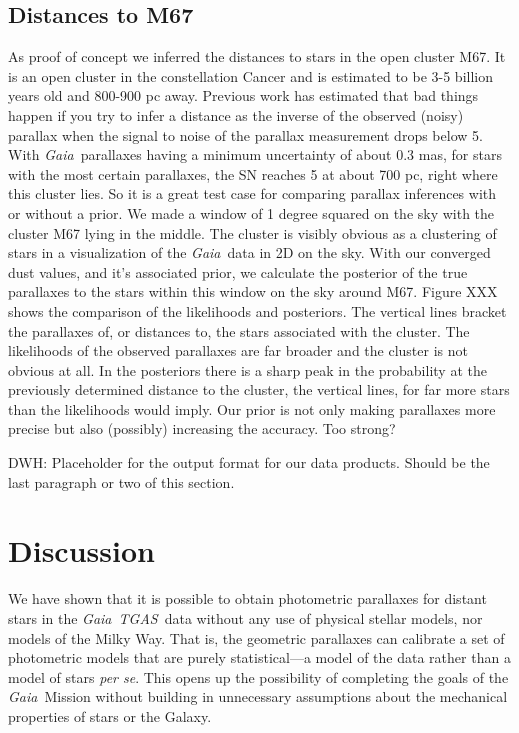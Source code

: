 \documentclass[modern]{aastex61}
\newcommand{\foreign}[1]{\textsl{#1}}
\newcommand{\acronym}[1]{{\small{#1}}}
\newcommand{\project}[1]{\textsl{#1}}
\newcommand{\tgas}{\project{\acronym{TGAS}}}
\newcommand{\gaia}{\project{Gaia}}
\begin{document}
\subsection{Distances to M67}
As proof of concept we inferred the distances to stars in the open cluster M67. It is an open cluster in the constellation Cancer and is estimated to be 3-5 billion years old and 800-900 pc away. Previous work has estimated that bad things happen if you try to infer a distance as the inverse of the observed (noisy) parallax when the signal to noise of the parallax measurement drops below 5. With \gaia\ parallaxes having a minimum uncertainty of about 0.3 mas, for stars with the most certain parallaxes, the SN reaches 5 at about 700 pc, right where this cluster lies. So it is a great test case for comparing parallax inferences with or without a prior. We made a window of 1 degree squared on the sky with the cluster M67 lying in the middle. The cluster is visibly obvious as a clustering of stars in a visualization of the \gaia\ data in 2D on the sky. With our converged dust values, and it's associated prior, we calculate the posterior of the true parallaxes to the stars within this window on the sky around M67. Figure XXX shows the comparison of the likelihoods and posteriors. The vertical lines bracket the parallaxes of, or distances to, the stars associated with the cluster. The likelihoods of the observed parallaxes are far broader and the cluster is not obvious at all. In the posteriors there is a sharp peak in the probability at the previously determined distance to the cluster, the vertical lines, for far more stars than the likelihoods would imply. Our prior is not only making parallaxes more precise but also (possibly) increasing the accuracy. Too strong? 


DWH: Placeholder for the output format for our data products. Should
be the last paragraph or two of this section.

\section{Discussion}

We have shown that it is possible to obtain photometric parallaxes for
distant stars in the \gaia\ \tgas\ data without any use of physical stellar
models, nor models of the Milky Way.
That is, the geometric parallaxes can calibrate a set of photometric
models that are purely statistical---a model of the data rather than
a model of stars \foreign{per se}.
This opens up the possibility of completing the goals of the \gaia\ Mission
without building in unnecessary assumptions about the mechanical properties
of stars or the Galaxy.
\end{document}
